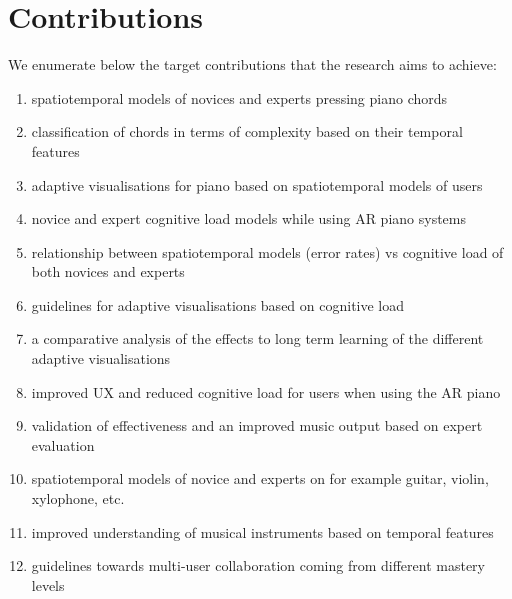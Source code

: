 \documentclass[manuscript,screen]{acmart}
\begin{document}
\section{Contributions}
\label{sec:contri}
We enumerate below the target contributions that the research aims to achieve: 
\begin{enumerate}
    \item spatiotemporal models of novices and experts pressing piano chords
    \item classification of chords in terms of complexity based on their temporal features
    \item adaptive visualisations for piano based on spatiotemporal models of users
    \item novice and expert cognitive load models while using AR piano systems
    \item relationship between spatiotemporal models (error rates) vs cognitive load of both novices and experts
    \item guidelines for adaptive visualisations based on cognitive load
    \item a comparative analysis of the effects to long term learning of the different adaptive visualisations
    \item improved UX and reduced cognitive load for users when using the AR piano
    \item validation of effectiveness and an improved music output based on expert evaluation
    \item spatiotemporal models of novice and experts on for example guitar, violin, xylophone, etc.
    \item improved understanding of musical instruments based on temporal features
    \item guidelines towards multi-user collaboration coming from different mastery levels
\end{enumerate}



\end{document}
